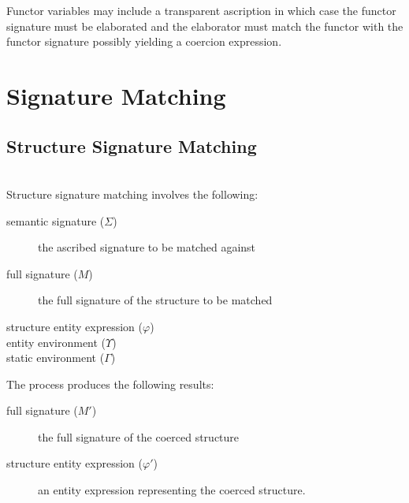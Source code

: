 Functor variables may include a transparent ascription in which case the functor signature must be elaborated and the elaborator must match the functor with the functor signature possibly yielding a coercion expression. 



\section{Signature Matching}
\subsection{Structure Signature Matching} 
\\
Structure signature matching involves the following:
\begin{description}
\item[semantic signature ($\Sigma$)] the ascribed signature to be matched against
\item[full signature ($M$)] the full signature of the structure to be matched
\item[structure entity expression ($\varphi$)] 
\item[entity environment ($\Upsilon$)]
\item[static environment ($\Gamma$)]
\end{description}

The process produces the following results:
\begin{description}
\item[full signature ($M'$)] the full signature of the coerced structure
\item[structure entity expression ($\varphi'$)] an entity expression representing the coerced structure. 
\end{description}

